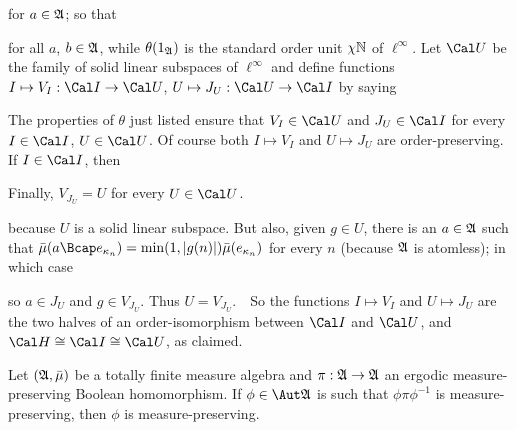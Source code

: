 {\noindent for $a\in\frak A$;  so that



\noindent for all $a$, $b\in\frak A$, while $\theta(1_{\frak A})$ is the
standard order unit $\chi\Bbb N$ of $\ell^{\infty}$.   
Let $\Cal U$ be the
family of solid linear subspaces of $\ell^{\infty}$ and define functions
$I\mapsto V_I:\Cal I\to\Cal U$, $U\mapsto J_U:\Cal U\to\Cal I$ by saying



\noindent The properties of $\theta$ just listed ensure that
$V_I\in\Cal U$ and  $J_U\in\Cal I$ for every $I\in\Cal I$, $U\in\Cal U$.
Of course
both $I\mapsto V_I$ and $U\mapsto J_U$ are order-preserving.   If
$I\in\Cal I$, then


\noindent Finally, $V_{J_U}=U$ for every $U\in\Cal U$.    \Prf\


\noindent because $U$ is a solid linear subspace.   But also, given
$g\in U$, there is an $a\in\frak A$ such that $\bar\mu(a\Bcap
e_{\kappa_n})=\min(1,|g(n)|)\bar\mu(e_{\kappa_n})$ for every $n$
(because $\frak A$ is atomless);  in which case


\noindent so $a\in J_U$ and $g\in V_{J_U}$.   Thus $U=V_{J_U}$.\ \QeD\
So the functions $I\mapsto V_I$ and $U\mapsto J_U$ are the two halves of
an order-isomorphism between $\Cal I$ and $\Cal U$, and
$\Cal H\cong\Cal I\cong\Cal U$, as claimed.
}%

 Let $(\frak A,\bar\mu)$ be a totally finite
measure algebra and $\pi:\frak A\to\frak A$ an ergodic
measure-preserving Boolean homomorphism.   If $\phi\in\Aut\frak A$ is
such that $\phi\pi\phi^{-1}$ is measure-preserving, then $\phi$ is
measure-preserving.

